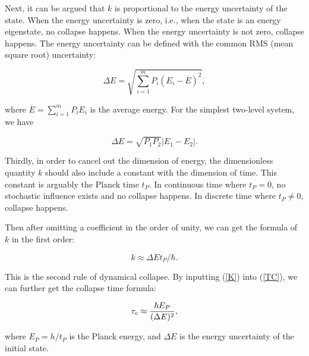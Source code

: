 Next, it can be argued that $k$ is proportional to the energy uncertainty of the state. When the energy uncertainty is zero, i.e., when the state is an energy eigenstate, no collapse happens. When the energy uncertainty is not zero, collapse happens. The energy uncertainty can be defined with the common RMS (mean square root) uncertainty:

\begin{equation}
\Delta E =\sqrt{  \sum_{i=1}^{m} {P_i(E_{i}-\overline{E})^2}  },
\label{EMUL}
\end{equation}

\noindent where $\overline{E}=\sum_{i=1}^{m} {P_iE_i}$ is the average energy. For the simplest two-level system, we have

\begin{equation}
\Delta E =\sqrt{P_1P_2}|E_1-E_2|.
\label{ETWO}
\end{equation}

Thirdly, in order to cancel out the dimension of energy, the dimensionless quantity $k$ should also include a constant with the dimension of time.
This constant is arguably the Planck time $t_P$. In continuous time where $t_P=0$, no stochastic influence exists and no collapse happens. In discrete time where $t_P \neq 0$, collapse happens. 

Then after omitting a coefficient in the order of unity, we can get the formula of $k$ in the first order:

\begin{equation}
k \approx \Delta E t_P/\hbar.
\label{K}
\end{equation}

\noindent This is the second rule of dynamical collapse. By inputting (\ref{K}) into (\ref{TC}), we can further get the collapse time formula:

\begin{equation}
\tau_c \approx {\hbar E_P \over {(\Delta E)^2}},
\label{CT}
\end{equation}

\noindent where $E_P=h/t_P$ is the Planck energy, and $\Delta E$ is the energy uncertainty of the initial state.


